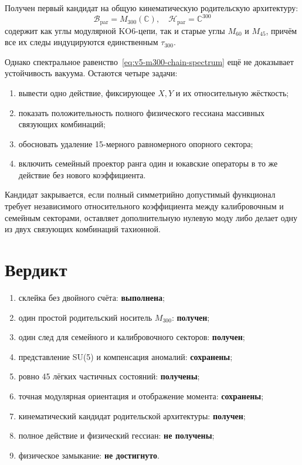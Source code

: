 Получен первый кандидат на общую кинематическую родительскую архитектуру:
\begin{equation}
 \boxed{
 \mathcal B_{\mathrm{par}}=M_{300}(\mathbb C),
 \quad
 \mathcal H_{\mathrm{par}}=\mathbb C^{300}
 }
\end{equation}
содержит как углы модулярной KO6-цепи, так и старые углы \(M_{60}\) и
\(M_{45}\), причём все их следы индуцируются единственным
\(\tau_{300}\).

Однако спектральное равенство~\eqref{eq:v5-m300-chain-spectrum} ещё не
доказывает устойчивость вакуума. Остаются четыре задачи:
\begin{enumerate}
 \item вывести одно действие, фиксирующее \(X,Y\) и их относительную
 жёсткость;
 \item показать положительность полного физического гессиана массивных
 связующих комбинаций;
 \item обосновать удаление 15-мерного равномерного опорного сектора;
 \item включить семейный проектор ранга один и юкавские операторы в то же
 действие без нового коэффициента.
\end{enumerate}

\begin{nogocriterion}
Кандидат закрывается, если полный симметрийно допустимый функционал требует
независимого относительного коэффициента между калибровочным и семейным
секторами, оставляет дополнительную нулевую моду либо делает одну из двух
связующих комбинаций тахионной.
\end{nogocriterion}

\section{Вердикт}

\begin{protocol}
\begin{enumerate}
 \item склейка без двойного счёта:
 \textbf{выполнена};
 \item один простой родительский носитель \(M_{300}\):
 \textbf{получен};
 \item один след для семейного и калибровочного секторов:
 \textbf{получен};
 \item представление SU(5) и компенсация аномалий:
 \textbf{сохранены};
 \item ровно 45 лёгких частичных состояний:
 \textbf{получены};
 \item точная модулярная ориентация и отображение момента:
 \textbf{сохранены};
 \item кинематический кандидат родительской архитектуры:
 \textbf{получен};
 \item полное действие и физический гессиан:
 \textbf{не получены};
 \item физическое замыкание:
 \textbf{не достигнуто}.
\end{enumerate}
\end{protocol}

